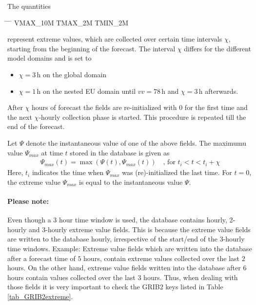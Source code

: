 The quantities
\begin{note}
\begin{tabbing}
  \hspace{0.2\textwidth} \= \hspace{0.2\textwidth} \= \hspace{0.2\textwidth} \= \hspace{0.2\textwidth} \kill
  VMAX\_10M \>
  TMAX\_2M \>
  TMIN\_2M 
\end{tabbing}
\end{note}
represent extreme values, which are collected over certain time intervals $\chi$, starting from the beginning of the forecast.
The interval $\chi$ differs for the different model domains and is set to 
\begin{itemize}
  \item $\chi=3\,\mathrm{h}$ on the global domain 
  \item $\chi=1\,\mathrm{h}$ on the nested EU domain until $vv=78\,\mathrm{h}$ and $\chi=3\,\mathrm{h}$ afterwards.
\end{itemize}
After $\chi$ hours of forecast the fields are re-initialized with $0$ for the first time and the next $\chi$-hourly collection 
phase is started. This procedure is repeated till the end of the forecast.

Let $\Psi$ denote the instantaneous value of one of the above fields. The maximumu value $\Psi_{max}$ at time $t$ stored in the 
database is given as
\begin{align*}
 \Psi_{max}(t) = \max(\Psi(t),\Psi_{max}(t))  \quad \text{, for } t_{i}<t<t_{i}+\chi
\end{align*}
Here, $t_{i}$ indicates the time when $\Psi_{max}$ was (re)-initialized the last time. For $t=0$, the extreme value $\Psi_{max}$ 
is equal to the instantaneous value $\Psi$. 

\paragraph{Please note:} Even though a 3 hour time window is used, the database contains hourly, 2-hourly and 3-hourly 
extreme value fields. This is because the extreme value fields are written to the database hourly, irrespective of the 
start/end of the 3-hourly time windows. Example: Extreme value fields which are written into the database after a 
forecast time of $5$ hours, contain extreme values collected over the last $2$ hours. On the other hand, extreme value fields 
written into the database after $6$ hours contain values collected over the last $3$ hours.
Thus, when dealing with those fields it is very important to check the GRIB2 keys listed in Table \ref{tab_GRIB2extreme}.


